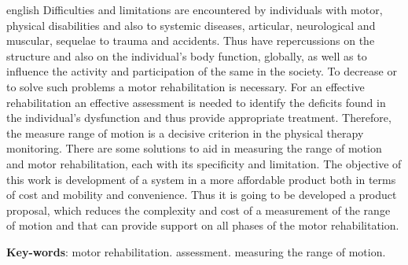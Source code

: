 \begin{resumo}[Abstract]
 \begin{otherlanguage*}{english}
Difficulties and limitations are encountered by individuals with motor, physical
disabilities and also to systemic diseases, articular, neurological and muscular,
 sequelae to trauma and accidents. Thus have repercussions on the structure and
 also on the individual's body function, globally, as well as to influence the
activity and  participation of the same in the society. To decrease or to solve such problems
 a motor rehabilitation is necessary. For an effective rehabilitation an effective
 assessment is needed to identify the deficits found in the individual's dysfunction
 and thus provide appropriate treatment. Therefore, the measure range of motion
 is a decisive criterion in the physical therapy monitoring. There are some solutions
 to aid in measuring the range of motion and motor rehabilitation, each with its
 specificity and limitation. The objective of this work is development of a system in a more affordable
 product both in terms of cost and mobility and convenience. Thus it is going to be developed
 a product proposal, which reduces the complexity and cost of a measurement of the
 range of motion and that can provide support on all phases of the motor rehabilitation.
   \vspace{\onelineskip}

   \noindent
   \textbf{Key-words}: motor rehabilitation. assessment. measuring the range of motion.
 \end{otherlanguage*}
\end{resumo}
